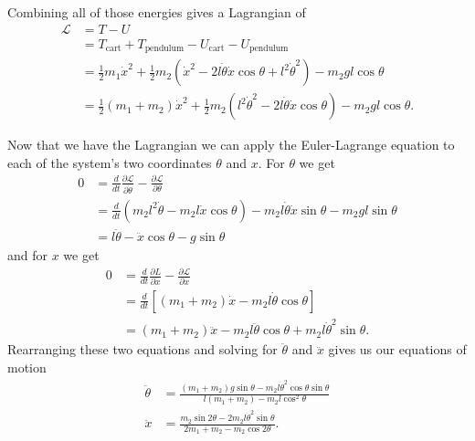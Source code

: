 \documentclass{article}
\begin{document}
Combining all of those energies gives a Lagrangian of \begin{align*}
  \mathcal{L} & = T - U                                                                                                                                     \\
              & = T_\text{cart} + T_\text{pendulum} - U_\text{cart} - U_\text{pendulum}                                                                     \\
              & = \frac{1}{2} m_1 \dot{x}^2 + \frac{1}{2} m_2 (\dot{x}^2 - 2 l \dot{\theta} \dot{x} \cos \theta + l^2 \dot{\theta}^2) - m_2 g l \cos \theta \\
              & = \frac{1}{2} (m_1 + m_2) \dot{x}^2 + \frac{1}{2} m_2 (l^2 \dot{\theta}^2 - 2 l \dot{\theta} \dot{x} \cos \theta) - m_2 g l \cos \theta.
\end{align*}

Now that we have the Lagrangian we can apply the Euler-Lagrange equation to each of the system's two coordinates $\theta$ and $x$. For $\theta$ we get \begin{align*}
  0 & = \frac{d}{d t} \frac{\partial \mathcal{L}}{\partial \dot{\theta}} - \frac{\partial \mathcal{L}}{\partial \theta}                 \\
    & = \frac{d}{d t} (m_2 l^2 \dot{\theta} - m_2 l \dot{x} \cos \theta) - m_2 l \dot{\theta} \dot{x} \sin \theta - m_2 g l \sin \theta \\
    & = l \ddot{\theta} - \ddot{x} \cos \theta - g \sin \theta
\end{align*} and for $x$ we get \begin{align*}
  0 & = \frac{d}{d t} \frac{\partial L}{\partial \dot{x}} - \frac{\partial \mathcal{L}}{\partial x} \\
    & = \frac{d}{d t} [(m_1 + m_2) \dot{x} - m_2 l \dot{\theta} \cos \theta]                        \\
    & = (m_1 + m_2) \ddot{x} - m_2 l \ddot{\theta} \cos \theta + m_2 l \dot{\theta}^2 \sin \theta.
\end{align*} Rearranging these two equations and solving for $\ddot{\theta}$ and $\ddot{x}$ gives us our equations of motion \begin{align*}
\ddot{\theta} & = \frac{(m_1 + m_2) g \sin \theta - m_2 l \dot{\theta}^2 \cos \theta \sin \theta}{l (m_1 + m_2) - m_2 l \cos^2 \theta} \\
\ddot{x}      & = \frac{m_2 \sin 2 \theta - 2 m_2 l \dot{\theta}^2 \sin \theta}{2 m_1 + m_2 - m_2 \cos 2 \theta}.
\end{align*}
\end{document}
